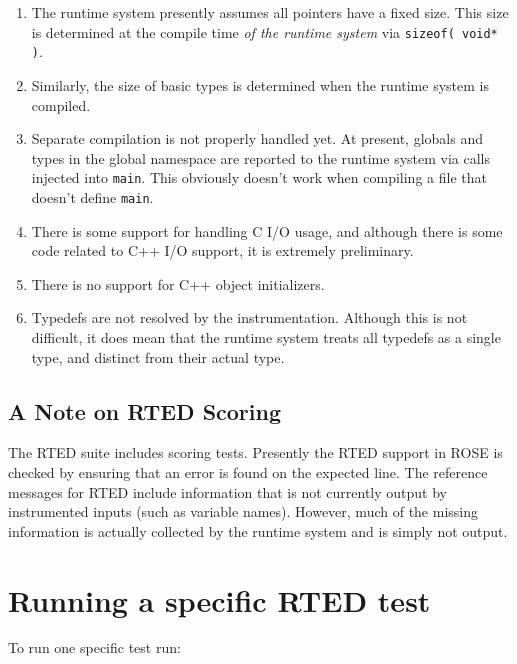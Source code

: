 \begin{enumerate}
    
    \item The runtime system presently assumes all pointers have a fixed size.
    This size is determined at the compile time \emph{of the runtime system} via
    \texttt{sizeof( void* )}.

    \item Similarly, the size of basic types is determined when the runtime
    system is compiled.

    \item Separate compilation is not properly handled yet.  At present, globals
    and types in the global namespace are reported to the runtime system via
    calls injected into \texttt{main}.  This obviously doesn't work when compiling a file
    that doesn't define \texttt{main}.

    \item There is some support for handling C I/O usage, and although there is
    some code related to C++ I/O support, it is extremely preliminary.

    \item There is no support for C++ object initializers.

    \item Typedefs are not resolved by the instrumentation.  Although this is
    not difficult, it does mean that the runtime system treats all typedefs as a
    single type, and distinct from their actual type.

\end{enumerate}

\subsection{A Note on RTED Scoring}

The RTED suite includes scoring tests.  Presently the RTED support in ROSE is
checked by ensuring that an error is found on the expected line.  The reference
messages for RTED include information that is not currently output by
instrumented inputs (such as variable names).  However, much of the missing
information is actually collected by the runtime system and is simply not
output.


\section{Running a specific RTED test}

 
To run one specific test run:

